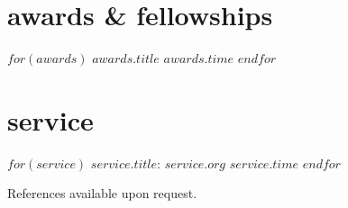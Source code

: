 \documentclass[]{friggeri-cv}
\begin{document}

\section{awards \& fellowships}
\begin{itemize}[noitemsep, leftmargin=0.55in]
$for(awards)$
  \entryitem
  {$awards.title$}
  {$awards.time$}
$endfor$
\end{itemize}




\section{service}
\begin{itemize}[noitemsep, leftmargin=0.55in]
$for(service)$
  \entryitem
  {$service.title$: $service.org$}
  {$service.time$}
$endfor$
\end{itemize}






\vspace{0.1in}
References available upon request.
\end{document}
